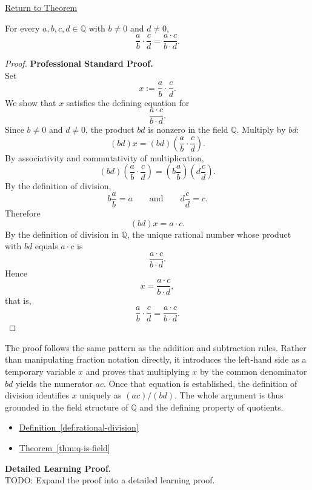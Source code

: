 \newpage
{}
\label{prf:rational-fraction-multiplication}

\begin{remark*}[Return]
\hyperref[thm:rational-fraction-multiplication]{Return to Theorem}
\end{remark*}

\begin{theorem*}
For every $a,b,c,d\in\mathbb{Q}$ with $b\neq 0$ and $d\neq 0$,
\[
\frac{a}{b}\cdot \frac{c}{d}
=
\frac{a\cdot c}{b\cdot d}.
\]
\end{theorem*}

\begin{proof}
\textbf{Professional Standard Proof.}~\\
Set
\[
x:=\frac{a}{b}\cdot\frac{c}{d}.
\]
We show that $x$ satisfies the defining equation for
\[
\frac{a\cdot c}{b\cdot d}.
\]
Since $b\neq 0$ and $d\neq 0$, the product $bd$ is nonzero in the field
$\mathbb{Q}$.  Multiply by $bd$:
\[
(bd)x=(bd)\left(\frac{a}{b}\cdot\frac{c}{d}\right).
\]
By associativity and commutativity of multiplication,
\[
(bd)\left(\frac{a}{b}\cdot\frac{c}{d}\right)
=
\left(b\frac{a}{b}\right)\left(d\frac{c}{d}\right).
\]
By the definition of division,
\[
b\frac{a}{b}=a
\qquad\text{and}\qquad
d\frac{c}{d}=c.
\]
Therefore
\[
(bd)x=a\cdot c.
\]
By the definition of division in $\mathbb{Q}$, the unique rational number
whose product with $bd$ equals $a\cdot c$ is
\[
\frac{a\cdot c}{b\cdot d}.
\]
Hence
\[
x=\frac{a\cdot c}{b\cdot d},
\]
that is,
\[
\frac{a}{b}\cdot\frac{c}{d}
=
\frac{a\cdot c}{b\cdot d}.
\]
\end{proof}

\begin{remark*}
The proof follows the same pattern as the addition and subtraction rules.
Rather than manipulating fraction notation directly, it introduces the
left-hand side as a temporary variable $x$ and proves that multiplying $x$
by the common denominator $bd$ yields the numerator $ac$.  Once that
equation is established, the definition of division identifies $x$
uniquely as $(ac)/(bd)$.  The whole argument is thus grounded in the field
structure of $\mathbb{Q}$ and the defining property of quotients.
\end{remark*}

\begin{dependencies}
\begin{itemize}
  \item \hyperref[def:rational-division]{Definition~\ref*{def:rational-division}}
  \item \hyperref[thm:q-is-field]{Theorem~\ref*{thm:q-is-field}}
\end{itemize}
\end{dependencies}

\textbf{Detailed Learning Proof.}~\\
TODO: Expand the proof into a detailed learning proof.

